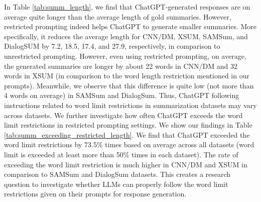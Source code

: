 \documentclass[11pt]{article}
\begin{document}
In Table \ref{tab:summ_length}, we find that ChatGPT-generated responses are on average quite longer than the average length of gold summaries. However, restricted prompting indeed helps ChatGPT to generate smaller summaries. More specifically, it reduces the average length for CNN/DM, XSUM, SAMSum, and DialogSUM by 7.2, 18.5, 17.4, and 27.9, respectively, in comparison to unrestricted prompting. However, even using restricted prompting, on average, the generated summaries are longer by about 22 words in CNN/DM and 32 words in XSUM (in comparison to the word length restriction mentioned in our prompts). Meanwhile, we observe that this difference is quite low (not more than 4 words on average) in SAMSum and DialogSum. Thus, ChatGPT following instructions related to word limit restrictions in summarization datasets may vary across datasets. We further investigate how often ChatGPT exceeds the word limit restrictions in restricted prompting settings. We show our findings in Table \ref{tab:summ_exceeding_restricted_length}. We find that ChatGPT exceeded the word limit restrictions by 73.5\% times based on average across all datasets (word limit is exceeded at least more than 50\% times in each dataset). The rate of exceeding the word limit restriction is much higher in CNN/DM and XSUM in comparison to SAMSum and DialogSum datasets. This creates a research question to investigate whether LLMs can properly follow the word limit restrictions given on their prompts for response generation. 
\begin{table*}
\centering
\small
{}
\caption{Average Length (Avg. Len) of Gold Summaries and ChatGPT Generated Summaries.}
\label{tab:summ_length}
\end{table*}
\end{document}
